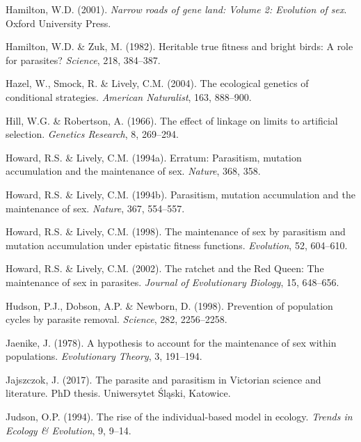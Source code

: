 \documentclass[
  american,
  letterpaper,
]{book}
\newlength{\cslhangindent}
\newenvironment{CSLReferences}[2] %
 {\begin{list}{}{%
  \setlength{\itemindent}{0pt}
  \setlength{\leftmargin}{0pt}
  \setlength{\parsep}{0pt}
  \ifodd #1
   \setlength{\leftmargin}{\cslhangindent}
   \setlength{\itemindent}{-1\cslhangindent}
  \fi
  \setlength{\itemsep}{#2\baselineskip}}}
 {\end{list}}
\begin{document}
\begin{CSLReferences}{1}{0}
Hamilton, W.D. (2001). \emph{Narrow roads of gene land: Volume 2:
Evolution of sex}. Oxford University Press.

Hamilton, W.D. \& Zuk, M. (1982). Heritable true fitness and bright
birds: A role for parasites? \emph{Science}, 218, 384--387.

Hazel, W., Smock, R. \& Lively, C.M. (2004). The ecological genetics of
conditional strategies. \emph{American Naturalist}, 163, 888--900.

Hill, W.G. \& Robertson, A. (1966). The effect of linkage on limits to
artificial selection. \emph{Genetics Research}, 8, 269--294.

Howard, R.S. \& Lively, C.M. (1994a). Erratum: Parasitism, mutation
accumulation and the maintenance of sex. \emph{Nature}, 368, 358.

Howard, R.S. \& Lively, C.M. (1994b). Parasitism, mutation accumulation
and the maintenance of sex. \emph{Nature}, 367, 554--557.

Howard, R.S. \& Lively, C.M. (1998). The maintenance of sex by
parasitism and mutation accumulation under epistatic fitness functions.
\emph{Evolution}, 52, 604--610.

Howard, R.S. \& Lively, C.M. (2002). The ratchet and the {Red Queen}:
The maintenance of sex in parasites. \emph{Journal of Evolutionary
Biology}, 15, 648--656.

Hudson, P.J., Dobson, A.P. \& Newborn, D. (1998). Prevention of
population cycles by parasite removal. \emph{Science}, 282, 2256--2258.

Jaenike, J. (1978). A hypothesis to account for the maintenance of sex
within populations. \emph{Evolutionary Theory}, 3, 191--194.

Jajszczok, J. (2017). The parasite and parasitism in {Victorian} science
and literature. PhD thesis. Uniwersytet Śląski, Katowice.

Judson, O.P. (1994). The rise of the individual-based model in ecology.
\emph{Trends in Ecology \& Evolution}, 9, 9--14.


\end{CSLReferences}
\end{document}
